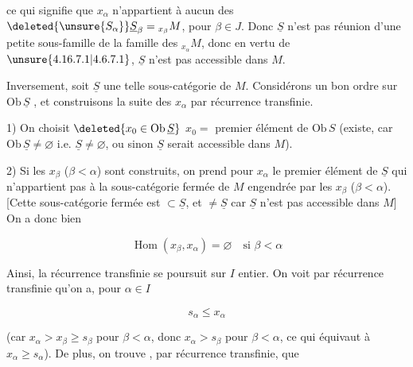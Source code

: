 


ce qui signifie que $x_\alpha$ n'appartient à aucun des $\deleted{\unsure{S_{\alpha}}}\underline S_\beta={}_{x_\beta}M$, pour $\beta\in J$. Donc $\underline S$ n'est pas réunion d'une petite sous-famille de la famille des $ {}_{x_\alpha}M$, donc en vertu de $\unsure{4.16.7.1|4.6.7.1}$, $\underline S$ n'est pas accessible dans $M$.

Inversement, soit $\underline S$ une telle sous-catégorie de $M$. Considérons un bon ordre sur $\mathrm{Ob}\,\underline S$ , et construisons la suite des $x_\alpha$  par récurrence transfinie.


1) On choisit $\deleted{x_0\in\mathrm{Ob}\,\underline S}$ $x_0={}$ premier élément de $\mathrm{Ob}\,S$ (existe, car $\mathrm{Ob}\,\underline S\ne\varnothing$ i.e. $\underline S\ne\varnothing$, ou sinon $\underline S$ serait accessible dans $M$).

2) Si les $x_\beta$ ($\beta<\alpha$) sont construits, on prend pour $x_\alpha$ le premier élément de $\underline S$  qui n'appartient pas à la sous-catégorie fermée de $M$ engendrée par les $x_\beta$ ($\beta<\alpha$). [Cette sous-catégorie fermée est $\subset\underline S$, et $\ne\underline S$ car $\underline S$ n'est pas accessible dans $M$] On a donc bien

\[
\operatorname{Hom}(x_\beta,x_\alpha)=\varnothing\quad\text{si }\beta<\alpha
\]



Ainsi, la récurrence transfinie se poursuit sur $I$  entier.  On voit par récurrence transfinie qu'on a, pour  $\alpha\in I$

\[s_\alpha\leq x_\alpha\]

(car $x_\alpha>x_\beta\geq s_\beta$ pour  $\beta<\alpha$, donc $x_\alpha>s_\beta$ pour  $\beta<\alpha$,  ce qui équivaut à $x_\alpha\geq s_\alpha$). De plus, on trouve , par récurrence transfinie, que

